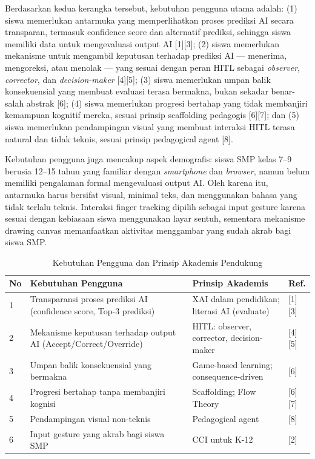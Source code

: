 \documentclass[12pt,oneside]{report}
\begin{document}
Berdasarkan kedua kerangka tersebut, kebutuhan pengguna utama adalah: (1) siswa memerlukan antarmuka yang memperlihatkan proses prediksi AI secara transparan, termasuk confidence score dan alternatif prediksi, sehingga siswa memiliki data untuk mengevaluasi output AI [1][3]; (2) siswa memerlukan mekanisme untuk mengambil keputusan terhadap prediksi AI --- menerima, mengoreksi, atau menolak --- yang sesuai dengan peran HITL sebagai \textit{observer}, \textit{corrector}, dan \textit{decision-maker} [4][5]; (3) siswa memerlukan umpan balik konsekuensial yang membuat evaluasi terasa bermakna, bukan sekadar benar-salah abstrak [6]; (4) siswa memerlukan progresi bertahap yang tidak membanjiri kemampuan kognitif mereka, sesuai prinsip scaffolding pedagogis [6][7]; dan (5) siswa memerlukan pendampingan visual yang membuat interaksi HITL terasa natural dan tidak teknis, sesuai prinsip pedagogical agent [8].

Kebutuhan pengguna juga mencakup aspek demografis: siswa SMP kelas 7--9 berusia 12--15 tahun yang familiar dengan \textit{smartphone} dan \textit{browser}, namun belum memiliki pengalaman formal mengevaluasi output AI. Oleh karena itu, antarmuka harus bersifat visual, minimal teks, dan menggunakan bahasa yang tidak terlalu teknis. Interaksi finger tracking dipilih sebagai input gesture karena sesuai dengan kebiasaan siswa menggunakan layar sentuh, sementara mekanisme drawing canvas memanfaatkan aktivitas menggambar yang sudah akrab bagi siswa SMP.

\begin{table}[H]
\centering
\caption{Kebutuhan Pengguna dan Prinsip Akademis Pendukung}
\label{tab:kebutuhan-pengguna}
\begin{tabular}{|p{0.5cm}|p{5cm}|p{4cm}|p{2.5cm}|}
\hline
\textbf{No} & \textbf{Kebutuhan Pengguna} & \textbf{Prinsip Akademis} & \textbf{Ref.} \\ \hline
1 & Transparansi proses prediksi AI (confidence score, Top-3 prediksi) & XAI dalam pendidikan; literasi AI (evaluate) & [1][3] \\ \hline
2 & Mekanisme keputusan terhadap output AI (Accept/Correct/Override) & HITL: observer, corrector, decision-maker & [4][5] \\ \hline
3 & Umpan balik konsekuensial yang bermakna & Game-based learning; consequence-driven & [6] \\ \hline
4 & Progresi bertahap tanpa membanjiri kognisi & Scaffolding; Flow Theory & [6][7] \\ \hline
5 & Pendampingan visual non-teknis & Pedagogical agent & [8] \\ \hline
6 & Input gesture yang akrab bagi siswa SMP & CCI untuk K-12 & [2] \\ \hline
\end{tabular}
\end{table}
\end{document}
